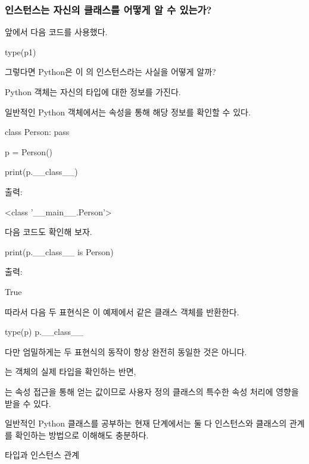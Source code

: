 \subsubsection{인스턴스는 자신의 클래스를 어떻게 알 수 있는가?}

앞에서 다음 코드를 사용했다.

\begin{dhkcode}
type(p1)
\end{dhkcode}

그렇다면 Python은 이 의 인스턴스라는 사실을 어떻게 알까?

Python 객체는 자신의 타입에 대한 정보를 가진다.

일반적인 Python 객체에서는  속성을 통해 해당 정보를 확인할 수 있다.

\begin{dhkcode}
class Person:
    pass

p = Person()

print(p.__class__)
\end{dhkcode}

출력:

\begin{dhkzsh}
<class '__main__.Person'>
\end{dhkzsh}

다음 코드도 확인해 보자.

\begin{dhkcode}
print(p.__class__ is Person)
\end{dhkcode}

출력:

\begin{dhkzsh}
True
\end{dhkzsh}

따라서 다음 두 표현식은 이 예제에서 같은 클래스 객체를 반환한다.

\begin{dhkcode}
type(p)
p.__class__
\end{dhkcode}

다만 엄밀하게는 두 표현식의 동작이 항상 완전히 동일한 것은 아니다.

는 객체의 실제 타입을 확인하는 반면,

는 속성 접근을 통해 얻는 값이므로 사용자 정의 클래스의 특수한 속성 처리에 영향을 받을 수 있다.

일반적인 Python 클래스를 공부하는 현재 단계에서는 둘 다 인스턴스와 클래스의 관계를 확인하는 방법으로 이해해도 충분하다.

\begin{dhknote}
\begin{dhksmry}[centered]
타입과 인스턴스 관계
\end{dhksmry}
\end{dhknote}


